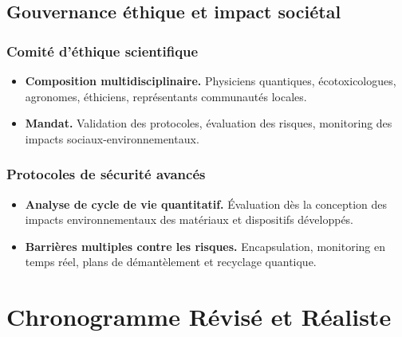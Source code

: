 \documentclass[12pt, a4paper]{article}
\begin{document}
\subsection{Gouvernance éthique et impact sociétal}

\subsubsection{Comité d'éthique scientifique}

\begin{itemize}
    \item \textbf{Composition multidisciplinaire.} Physiciens quantiques, écotoxicologues, agronomes, éthiciens, représentants communautés locales.
    
    \item \textbf{Mandat.} Validation des protocoles, évaluation des risques, monitoring des impacts sociaux-environnementaux.
\end{itemize}

\subsubsection{Protocoles de sécurité avancés}

\begin{itemize}
    \item \textbf{Analyse de cycle de vie quantitatif.} Évaluation dès la conception des impacts environnementaux des matériaux et dispositifs développés.
    
    \item \textbf{Barrières multiples contre les risques.} Encapsulation, monitoring en temps réel, plans de démantèlement et recyclage quantique.
\end{itemize}

\section{Chronogramme Révisé et Réaliste}
\end{document}
